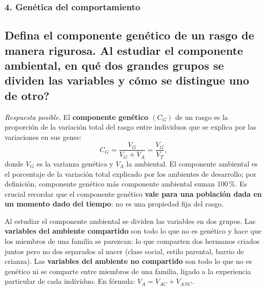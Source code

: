 \documentclass[11pt, a4paper]{article}
\newcommand{\pregunta}[1]{\subsection{#1}}
\newcommand{\eje}[1]{\subsubsection{#1}}
\begin{document}
\eje{4. Gen\'etica del comportamiento}
\pregunta{Defina el \textbf{componente gen\'etico} de un rasgo de manera rigurosa. Al estudiar el componente ambiental, \textquestiondown en qu\'e dos grandes grupos se dividen las variables y c\'omo se distingue uno de otro?}

\begin{respuesta}
\textit{Respuesta posible.} El \textbf{componente gen\'etico $(C_G)$} de un rasgo es la proporci\'on de la variaci\'on total del rasgo entre individuos que se explica por las variaciones en sus genes:
\[
C_G = \frac{V_G}{V_G + V_A} = \frac{V_G}{V_T},
\]
donde $V_G$ es la varianza gen\'etica y $V_A$ la ambiental. El componente ambiental es el porcentaje de la variaci\'on total explicado por los ambientes de desarrollo; por definici\'on, componente gen\'etico m\'as componente ambiental suman 100\,\%. Es crucial recordar que el componente gen\'etico \textbf{vale para una poblaci\'on dada en un momento dado del tiempo}: no es una propiedad fija del rasgo.

Al estudiar el componente ambiental se dividen las variables en dos grupos. Las \textbf{variables del ambiente compartido} son todo lo que no es gen\'etico y hace que los miembros de una familia se parezcan: lo que comparten dos hermanos criados juntos pero no dos separados al nacer (clase social, estilo parental, barrio de crianza). Las \textbf{variables del ambiente no compartido} son todo lo que no es gen\'etico ni se comparte entre miembros de una familia, ligado a la experiencia particular de cada individuo. En f\'ormula: $V_A = V_{AC} + V_{ANC}$.
\end{respuesta}
\end{document}
